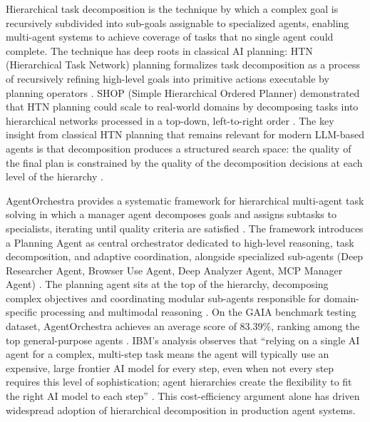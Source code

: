 \documentclass[11pt,oneside]{article}
\begin{document}
Hierarchical task decomposition is the technique by which a complex goal is recursively subdivided into sub-goals assignable to specialized agents, enabling multi-agent systems to achieve coverage of tasks that no single agent could complete. The technique has deep roots in classical AI planning: HTN (Hierarchical Task Network) planning formalizes task decomposition as a process of recursively refining high-level goals into primitive actions executable by planning operators \cite{htn1993,htn2000}. SHOP (Simple Hierarchical Ordered Planner) demonstrated that HTN planning could scale to real-world domains by decomposing tasks into hierarchical networks processed in a top-down, left-to-right order \cite{htn2000}. The key insight from classical HTN planning that remains relevant for modern LLM-based agents is that decomposition produces a structured search space: the quality of the final plan is constrained by the quality of the decomposition decisions at each level of the hierarchy \cite{htn1993,htn2000}.

AgentOrchestra provides a systematic framework for hierarchical multi-agent task solving in which a manager agent decomposes goals and assigns subtasks to specialists, iterating until quality criteria are satisfied \cite{agentorchestra2025}. The framework introduces a Planning Agent as central orchestrator dedicated to high-level reasoning, task decomposition, and adaptive coordination, alongside specialized sub-agents (Deep Researcher Agent, Browser Use Agent, Deep Analyzer Agent, MCP Manager Agent) \cite{agentorchestra2025}. The planning agent sits at the top of the hierarchy, decomposing complex objectives and coordinating modular sub-agents responsible for domain-specific processing and multimodal reasoning \cite{agentorchestra2025}. On the GAIA benchmark testing dataset, AgentOrchestra achieves an average score of 83.39\%, ranking among the top general-purpose agents \cite{agentorchestra2025}. IBM's analysis observes that ``relying on a single AI agent for a complex, multi-step task means the agent will typically use an expensive, large frontier AI model for every step, even when not every step requires this level of sophistication; agent hierarchies create the flexibility to fit the right AI model to each step'' \cite{ibm2025hierarchical}. This cost-efficiency argument alone has driven widespread adoption of hierarchical decomposition in production agent systems.
\end{document}

